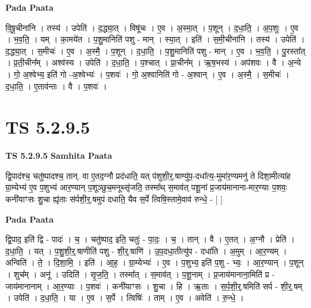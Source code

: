 \documentclass[17pt]{extarticle}
\begin{document}
\textbf{Pada Paata} \newline

वि॒षू॒चीना॑नि । तस्य॑ । उपेति॑ । द॒द्ध्या॒त् । विषू॑चः । ए॒व । अ॒स्मा॒त् । प॒शून् । द॒धा॒ति॒ । अ॒प॒शुः । ए॒व । भ॒व॒ति॒ । यम् । का॒मये॑त । प॒शु॒मानिति॑ पशु - मान् । स्या॒त् । इति॑ । स॒मी॒चीना॑नि । तस्य॑ । उपेति॑ । द॒द्ध्या॒त् । स॒मीचः॑ । ए॒व । अ॒स्मै॒ । प॒शून् । द॒धा॒ति॒ । प॒शु॒मानिति॑ पशु - मान् । ए॒व । भ॒व॒ति॒ । पु॒रस्ता᳚त् । प्र॒ती॒चीन᳚म् । अश्व॑स्य । उपेति॑ । द॒धा॒ति॒ । प॒श्चात् । प्रा॒चीन᳚म् । ऋ॒ष॒भस्य॑ । अप॑शवः । वै । अ॒न्ये । गो॒ अ॒श्वेभ्य॒ इति॑ गो -अ॒श्वेभ्यः॑ । प॒शवः॑ । गो॒ अ॒श्वानिति॑ गो - अ॒श्वान् । ए॒व । अ॒स्मै॒ । स॒मीचः॑ । द॒धा॒ति॒ । ए॒ताव॑न्तः । वै । प॒शवः॑ ।  \newline





\section{ TS 5.2.9.5 }

\textbf{TS 5.2.9.5 } \newline
\textbf{Samhita Paata} \newline

द्वि॒पाद॑श्च॒ चतु॑ष्पादश्च॒ तान्. वा ए॒तद॒ग्नौ प्रद॑धाति॒ यत् प॑शुशी॒र्॒.षाण्यु॑प॒-दधा᳚त्य॒-मुमा॑र॒ण्यमनु॑ ते दिशा॒मीत्या॑ह ग्रा॒म्येभ्य॑ ए॒व प॒शुभ्य॑ आर॒ण्यान् प॒शूञ्छुच॒मनूथ्सृ॑जति॒ तस्मा᳚थ् स॒माव॑त् पशू॒नां प्र॒जाय॑मानाना-मार॒ण्याः प॒शवः॒ कनी॑याꣳसः शु॒चा ह्यृ॑ताः स॑र्पशी॒र्॒.षमुप॑ दधाति॒ यैव स॒र्पे त्विषि॒स्तामे॒वाव॑ रुन्धे॒ - [  ] \newline

\textbf{Pada Paata} \newline

द्वि॒पाद॒ इति॑ द्वि - पादः॑ । च॒ । चतु॑ष्पाद॒ इति॒ चतुः॑ - पा॒दः॒ । च॒ । तान् । वै । ए॒तत् । अ॒ग्नौ । प्रेति॑ । द॒धा॒ति॒ । यत् । प॒शु॒शी॒र्॒.षाणीति॑ पशु - शी॒र्॒.षाणि॑ । उ॒प॒दधा॒तीत्यु॑प - दधा॑ति । अ॒मुम् । आ॒र॒ण्यम् । अन्विति॑ । ते॒ । दि॒शा॒मि॒ । इति॑ । आ॒ह॒ । ग्रा॒म्येभ्यः॑ । ए॒व । प॒शुभ्य॒ इति॑ प॒शु - भ्यः॒ । आ॒र॒ण्यान् । प॒शून् । शुच᳚म् । अनू॑ । उदिति॑ । सृ॒ज॒ति॒ । तस्मा᳚त् । स॒माव॑त् । प॒शू॒नाम् । प्र॒जाय॑मानाना॒मिति॑ प्र - जाय॑मानानाम् । आ॒र॒ण्याः । प॒शवः॑ । कनी॑याꣳसः । शु॒चा । हि । ऋ॒ताः । स॒र्प॒शी॒र्॒.षमिति॑ सर्प - शी॒र्॒.षम् । उपेति॑ । द॒धा॒ति॒ । या । ए॒व । स॒र्पे । त्विषिः॑ । ताम् । ए॒व । अवेति॑ । रु॒न्धे॒ ।  \newline
\end{document}
